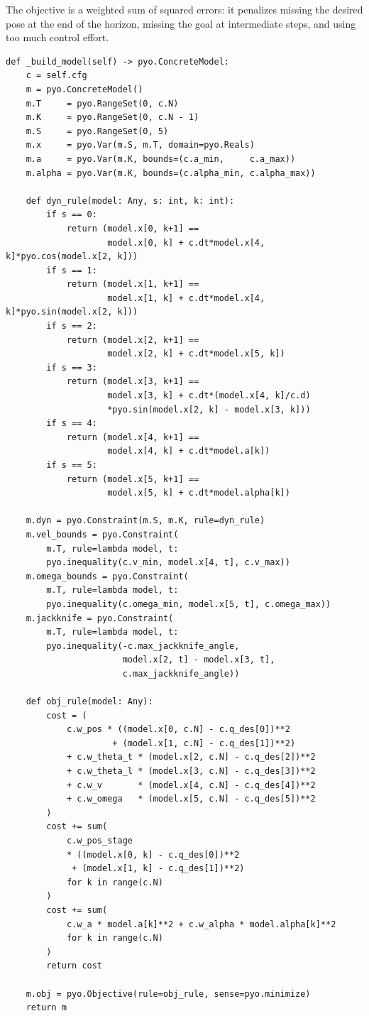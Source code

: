 \documentclass[11pt, letterpaper]{article}
\begin{document}
The objective is a weighted sum of squared errors: it penalizes missing
the desired pose at the end of the horizon, missing the goal at
intermediate steps, and using too much control effort.

\begin{lstlisting}[style=python]
def _build_model(self) -> pyo.ConcreteModel:
    c = self.cfg
    m = pyo.ConcreteModel()
    m.T     = pyo.RangeSet(0, c.N)
    m.K     = pyo.RangeSet(0, c.N - 1)
    m.S     = pyo.RangeSet(0, 5)
    m.x     = pyo.Var(m.S, m.T, domain=pyo.Reals)
    m.a     = pyo.Var(m.K, bounds=(c.a_min,     c.a_max))
    m.alpha = pyo.Var(m.K, bounds=(c.alpha_min, c.alpha_max))

    def dyn_rule(model: Any, s: int, k: int):
        if s == 0:
            return (model.x[0, k+1] ==
                    model.x[0, k] + c.dt*model.x[4, k]*pyo.cos(model.x[2, k]))
        if s == 1:
            return (model.x[1, k+1] ==
                    model.x[1, k] + c.dt*model.x[4, k]*pyo.sin(model.x[2, k]))
        if s == 2:
            return (model.x[2, k+1] ==
                    model.x[2, k] + c.dt*model.x[5, k])
        if s == 3:
            return (model.x[3, k+1] ==
                    model.x[3, k] + c.dt*(model.x[4, k]/c.d)
                    *pyo.sin(model.x[2, k] - model.x[3, k]))
        if s == 4:
            return (model.x[4, k+1] ==
                    model.x[4, k] + c.dt*model.a[k])
        if s == 5:
            return (model.x[5, k+1] ==
                    model.x[5, k] + c.dt*model.alpha[k])

    m.dyn = pyo.Constraint(m.S, m.K, rule=dyn_rule)
    m.vel_bounds = pyo.Constraint(
        m.T, rule=lambda model, t:
        pyo.inequality(c.v_min, model.x[4, t], c.v_max))
    m.omega_bounds = pyo.Constraint(
        m.T, rule=lambda model, t:
        pyo.inequality(c.omega_min, model.x[5, t], c.omega_max))
    m.jackknife = pyo.Constraint(
        m.T, rule=lambda model, t:
        pyo.inequality(-c.max_jackknife_angle,
                       model.x[2, t] - model.x[3, t],
                       c.max_jackknife_angle))

    def obj_rule(model: Any):
        cost = (
            c.w_pos * ((model.x[0, c.N] - c.q_des[0])**2
                     + (model.x[1, c.N] - c.q_des[1])**2)
            + c.w_theta_t * (model.x[2, c.N] - c.q_des[2])**2
            + c.w_theta_l * (model.x[3, c.N] - c.q_des[3])**2
            + c.w_v       * (model.x[4, c.N] - c.q_des[4])**2
            + c.w_omega   * (model.x[5, c.N] - c.q_des[5])**2
        )
        cost += sum(
            c.w_pos_stage
            * ((model.x[0, k] - c.q_des[0])**2
             + (model.x[1, k] - c.q_des[1])**2)
            for k in range(c.N)
        )
        cost += sum(
            c.w_a * model.a[k]**2 + c.w_alpha * model.alpha[k]**2
            for k in range(c.N)
        )
        return cost

    m.obj = pyo.Objective(rule=obj_rule, sense=pyo.minimize)
    return m
\end{lstlisting}
\end{document}
